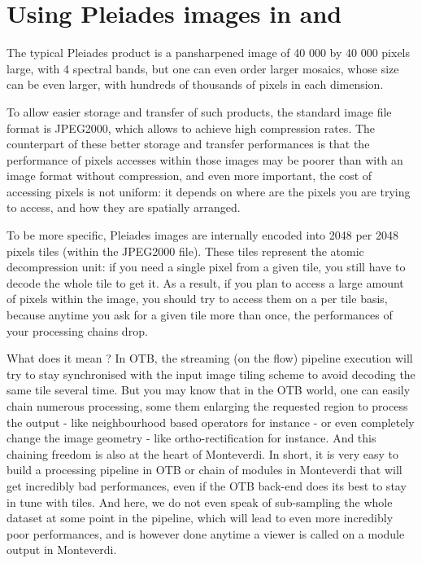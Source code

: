 \newpage
\section{Using Pleiades images in \app and \mont}\label{sec:pleiades}

The typical Pleiades product is a pansharpened image of 40 000 by 40
000 pixels large, with 4 spectral bands, but one can even order larger
mosaics, whose size can be even larger, with hundreds of thousands of
pixels in each dimension.

To allow easier storage and transfer of such products, the standard
image file format is JPEG2000, which allows to achieve high
compression rates. The counterpart of these better storage and
transfer performances is that the performance of pixels accesses
within those images may be poorer than with an image format without
compression, and even more important, the cost of accessing pixels is
not uniform: it depends on where are the pixels you are trying to
access, and how they are spatially arranged.

To be more specific, Pleiades images are internally encoded into 2048
per 2048 pixels tiles (within the JPEG2000 file). These tiles
represent the atomic decompression unit: if you need a single pixel
from a given tile, you still have to decode the whole tile to get
it. As a result, if you plan to access a large amount of pixels within
the image, you should try to access them on a per tile basis, because
anytime you ask for a given tile more than once, the performances of
your processing chains drop.

What does it mean ? In OTB, the streaming (on the flow) pipeline
execution will try to stay synchronised with the input image tiling
scheme to avoid decoding the same tile several time. But you may know
that in the OTB world, one can easily chain numerous processing, some
them enlarging the requested region to process the output - like
neighbourhood based operators for instance - or even completely change
the image geometry - like ortho-rectification for instance. And this
chaining freedom is also at the heart of Monteverdi. In short, it is
very easy to build a processing pipeline in OTB or chain of modules in
Monteverdi that will get incredibly bad performances, even if the OTB
back-end does its best to stay in tune with tiles. And here, we do not
even speak of sub-sampling the whole dataset at some point in the
pipeline, which will lead to even more incredibly poor performances,
and is however done anytime a viewer is called on a module output in
Monteverdi.

